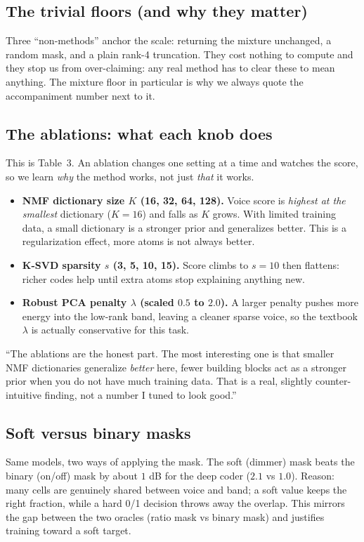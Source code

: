 \documentclass[11pt]{article}
\begin{document}
\subsection{The trivial floors (and why they matter)}
Three ``non-methods'' anchor the scale: returning the mixture unchanged, a random
mask, and a plain rank-4 truncation. They cost nothing to compute and they stop us
from over-claiming: any real method has to clear these to mean anything. The
mixture floor in particular is why we always quote the accompaniment number next to
it.

\subsection{The ablations: what each knob does}
This is Table~3. An ablation changes one setting at a time and watches the score, so
we learn \emph{why} the method works, not just \emph{that} it works.

\begin{itemize}
\item \textbf{NMF dictionary size $K$ (16, 32, 64, 128).} Voice score is
\emph{highest at the smallest} dictionary ($K=16$) and falls as $K$ grows. With
limited training data, a small dictionary is a stronger prior and generalizes
better. This is a regularization effect, more atoms is not always better.
\item \textbf{K-SVD sparsity $s$ (3, 5, 10, 15).} Score climbs to $s=10$ then
flattens: richer codes help until extra atoms stop explaining anything new.
\item \textbf{Robust PCA penalty $\lambda$ (scaled $0.5$ to $2.0$).} A larger
penalty pushes more energy into the low-rank band, leaving a cleaner sparse voice,
so the textbook $\lambda$ is actually conservative for this task.
\end{itemize}

\begin{saythis}
``The ablations are the honest part. The most interesting one is that smaller NMF
dictionaries generalize \emph{better} here, fewer building blocks act as a stronger
prior when you do not have much training data. That is a real, slightly
counter-intuitive finding, not a number I tuned to look good.''
\end{saythis}

\subsection{Soft versus binary masks}
Same models, two ways of applying the mask. The soft (dimmer) mask beats the binary
(on/off) mask by about $1$ dB for the deep coder ($2.1$ vs $1.0$). Reason: many
cells are genuinely shared between voice and band; a soft value keeps the right
fraction, while a hard 0/1 decision throws away the overlap. This mirrors the gap
between the two oracles (ratio mask vs binary mask) and justifies training toward a
soft target.
\end{document}
